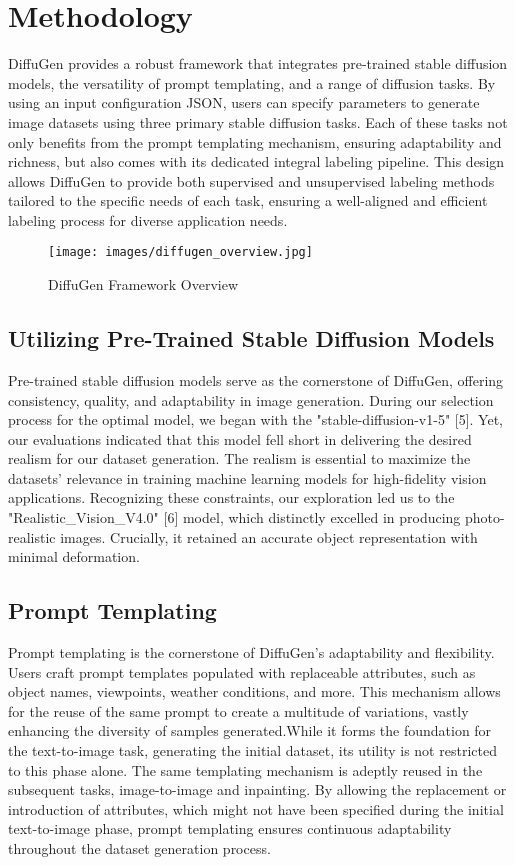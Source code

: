 \documentclass{article}
\begin{document}
\section{Methodology}
DiffuGen provides a robust framework that integrates pre-trained stable diffusion models, the versatility of prompt templating, and a range of diffusion tasks. By using an input configuration JSON, users can specify parameters to generate image datasets using three primary stable diffusion tasks. Each of these tasks not only benefits from the prompt templating mechanism, ensuring adaptability and richness, but also comes with its dedicated integral labeling pipeline. This design allows DiffuGen to provide both supervised and unsupervised labeling methods tailored to the specific needs of each task, ensuring a well-aligned and efficient labeling process for diverse application needs.

    \begin{figure}[H]
        \centering
        \texttt{[image: images/diffugen\_overview.jpg]}
        \caption{DiffuGen Framework Overview}
        \label{fig:diffugen_overview}
    \end{figure}

\subsection{Utilizing Pre-Trained Stable Diffusion Models}
Pre-trained stable diffusion models serve as the cornerstone of DiffuGen, offering consistency, quality, and adaptability in image generation. During our selection process for the optimal model, we began with the "stable-diffusion-v1-5" [5]. Yet, our evaluations indicated that this model fell short in delivering the desired realism for our dataset generation. The realism is essential to maximize the datasets' relevance in training machine learning models for high-fidelity vision applications. Recognizing these constraints, our exploration led us to the "Realistic\_Vision\_V4.0" [6] model, which distinctly excelled in producing photo-realistic images. Crucially, it retained an accurate object representation with minimal deformation.

\subsection{Prompt Templating}
Prompt templating is the cornerstone of DiffuGen's adaptability and flexibility. Users craft prompt templates populated with replaceable attributes, such as object names, viewpoints, weather conditions, and more. 
This mechanism allows for the reuse of the same prompt to create a multitude of variations, vastly enhancing the diversity of samples generated.While it forms the foundation for the text-to-image task, generating the initial dataset, its utility is not restricted to this phase alone. The same templating mechanism is adeptly reused in the subsequent tasks, image-to-image and inpainting. By allowing the replacement or introduction of attributes, which might not have been specified during the initial text-to-image phase, prompt templating ensures continuous adaptability throughout the dataset generation process.
\end{document}
